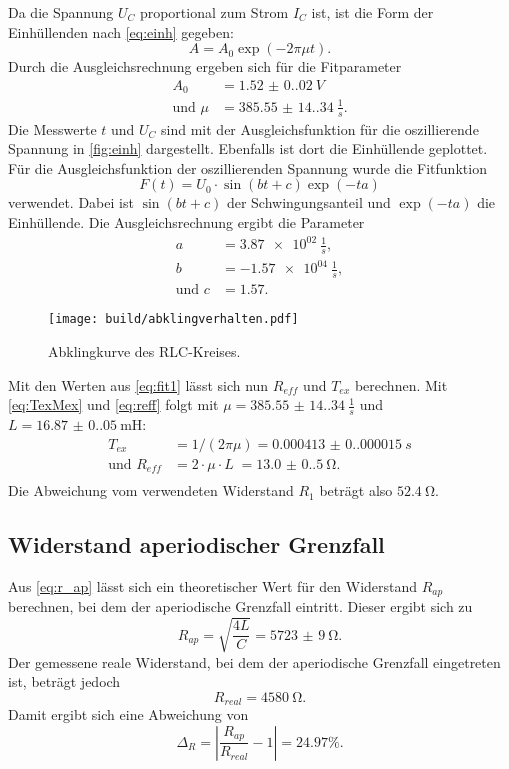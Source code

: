 Da die Spannung $U_C$ proportional zum Strom $I_C$ ist, ist die Form der Einhüllenden nach \autoref{eq:einh} gegeben:
\begin{equation*}
  A = A_0 \exp(-2 \pi \mu t).
\end{equation*}
Durch die Ausgleichsrechnung ergeben sich für die Fitparameter
\begin{align}
  A_0 &= \SI{1.52(0.02)}{V} \\
  \text{und } \mu &= \SI{385.55(14.34)}{\frac{1}{s}}.
  \label{eq:fit1}
\end{align}
Die Messwerte $t$ und $U_C$ sind mit der Ausgleichsfunktion für die oszillierende Spannung in \autoref{fig:einh} dargestellt. Ebenfalls ist dort die Einhüllende
geplottet.
Für die Ausgleichsfunktion der oszillierenden Spannung wurde die Fitfunktion
\begin{equation*}
  F(t) = U_0 \cdot \sin(bt+c) \exp(-ta)
\end{equation*}
verwendet. Dabei ist $\sin(bt+c)$ der Schwingungsanteil und $\exp(-ta)$ die Einhüllende. 
Die Ausgleichsrechnung ergibt die Parameter
\begin{align*}
  a &= \SI{3.87e02}{\frac{1}{s}},\\
  b &= \SI{-1.57e04}{\frac{1}{s}},\\
  \text{und } c &= \SI{1.57}.
\end{align*}
\begin{figure}[H]
  \texttt{[image: build/abklingverhalten.pdf]}
  \caption{Abklingkurve des RLC-Kreises.}
  \label{fig:einh}
\end{figure}
Mit den Werten aus \autoref{eq:fit1} lässt sich nun $R_{eff}$ und $T_{ex}$ berechnen. Mit \autoref{eq:TexMex} und \autoref{eq:reff} folgt mit 
$\mu = \SI{385.55(14.34)}{\frac{1}{s}}$ und $L = \SI{16.87(0.05)}{\milli\henry}$:
\begin{align*}
  T_{ex} &= 1/(2\pi\mu)                      = \SI{0.000413(0.000015)}{s}\\
  \text{und } R_{eff} &= 2 \cdot \mu \cdot L \; = \SI{13.0(0.5)}{\ohm}.\\
\end{align*}
Die Abweichung vom verwendeten Widerstand $R_1$ beträgt also $\SI{52.4}{\ohm}$.

\subsection{Widerstand aperiodischer Grenzfall}\label{sec:ap}
Aus \autoref{eq:r_ap} lässt sich ein theoretischer Wert für den Widerstand $R_{ap}$ berechnen, bei dem der aperiodische Grenzfall eintritt.
Dieser ergibt sich zu
\begin{equation*}
  R_{ap} = \sqrt{\frac{4L}{C}} = \SI{5723(9)}{\ohm}.
\end{equation*}
Der gemessene reale Widerstand, bei dem der aperiodische Grenzfall eingetreten ist, beträgt jedoch
\begin{equation*}
  R_{real} = \SI{4580}{\ohm}.
\end{equation*}
Damit ergibt sich eine Abweichung von
\begin{equation*}
  \Delta_R = |\frac{R_{ap}}{R_{real}} - 1| = 24.97\%.
\end{equation*}

